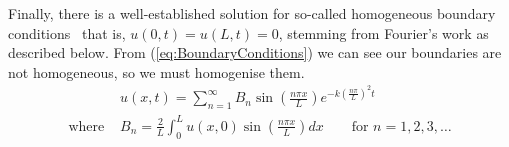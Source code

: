 Finally, there is a well-established solution for so-called homogeneous boundary conditions \textendash\ that is, $u(0,t) = u(L,t) = 0$, stemming from Fourier's work \citep{Lamar2018Dawkins} as described below. 
From (\ref{eq:BoundaryConditions}) we can see our boundaries are not homogeneous, so we must homogenise them.
\begin{equation}
\begin{split} \label{eq:FourierSolution}
&u(x,t) = \sum_{n=1}^{\infty} B_n \sin \left (\frac{n\pi x}{L} \right) e^{-k(\frac{n\pi}{L})^2 t} \\
\text{where }&B_n = \frac{2}{L} \int_0^L u(x,0) \sin \left( \frac{n\pi x}{L} \right) dx \quad \quad \text{for } n=1,2,3,\ldots 
\end{split}
\end{equation}